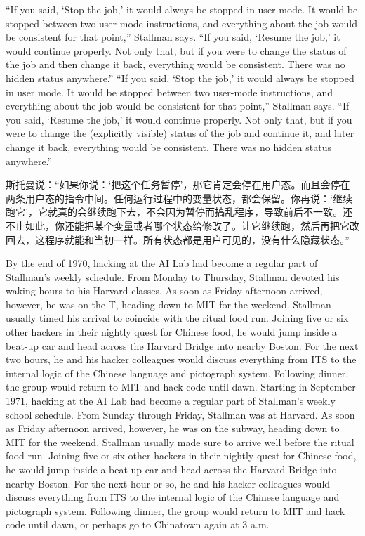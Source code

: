 \ifdefined\eng
\ifdefined\vone
``If you said, `Stop the job,' it would always be stopped in user mode. It would be stopped between two user-mode instructions, and everything about the job would be consistent for that point,'' Stallman says. ``If you said, `Resume the job,' it would continue properly. Not only that, but if you were to change the status of the job and then change it back, everything would be consistent. There was no hidden status anywhere.''
\fi
\ifdefined\vtwo
``If you said, `Stop the job,' it would always be stopped in user mode. It would be stopped between two user-mode instructions, and everything about the job would be consistent for that point,'' Stallman says. ``If you said, `Resume the job,' it would continue properly. Not only that, but if you were to change the (explicitly visible) status of the job and continue it, and later change it back, everything would be consistent. There was no hidden status anywhere.''
\fi
\fi

\ifdefined\chs
斯托曼说：``如果你说：`把这个任务暂停'，那它肯定会停在用户态。而且会停在两条用户态的指令中间。任何运行过程中的变量状态，都会保留。你再说：`继续跑它'，它就真的会继续跑下去，不会因为暂停而搞乱程序，导致前后不一致。还不止如此，你还能把某个变量或者哪个状态给修改了。让它继续跑，然后再把它改回去，这程序就能和当初一样。所有状态都是用户可见的，没有什么隐藏状态。''
\fi

\ifdefined\eng
\ifdefined\vone
By the end of 1970, hacking at the AI Lab had become a regular part of Stallman's weekly schedule. From Monday to Thursday, Stallman devoted his waking hours to his Harvard classes. As soon as Friday afternoon arrived, however, he was on the T, heading down to MIT for the weekend. Stallman usually timed his arrival to coincide with the ritual food run. Joining five or six other hackers in their nightly quest for Chinese food, he would jump inside a beat-up car and head across the Harvard Bridge into nearby Boston. For the next two hours, he and his hacker colleagues would discuss everything from ITS to the internal logic of the Chinese language and pictograph system. Following dinner, the group would return to MIT and hack code until dawn.
\fi
\ifdefined\vtwo
Starting in September 1971, hacking at the AI Lab had become a regular part of Stallman's weekly school schedule. From Sunday through Friday, Stallman was at Harvard. As soon as Friday afternoon arrived, however, he was on the subway, heading down to MIT for the weekend. Stallman usually made sure to arrive well before the ritual food run. Joining five or six other hackers in their nightly quest for Chinese food, he would jump inside a beat-up car and head across the Harvard Bridge into nearby Boston. For the next hour or so, he and his hacker colleagues would discuss everything from ITS to the internal logic of the Chinese language and pictograph system. Following dinner, the group would return to MIT and hack code until dawn, or perhaps go to Chinatown again at 3 a.m.
\fi
\fi

